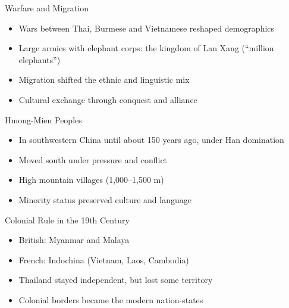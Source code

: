 \documentclass{beamer}
\begin{document}
\begin{frame}{Warfare and Migration}
    \begin{itemize}
        \item Wars between Thai, Burmese and Vietnamese reshaped demographics
        \item Large armies with elephant corps: the kingdom of Lan Xang
          (``million elephants'')
        \item Migration shifted the ethnic and linguistic mix
        \item Cultural exchange through conquest and alliance
    \end{itemize}
\end{frame}

\begin{frame}{Hmong-Mien Peoples}
    \begin{itemize}
        \item In southwestern China until about 150 years ago, under Han domination
        \item Moved south under pressure and conflict
        \item High mountain villages (1,000--1,500 m)
        \item Minority status preserved culture and language
     \end{itemize}
\end{frame}

\begin{frame}{Colonial Rule in the 19th Century}
    \begin{itemize}
        \item British: Myanmar and Malaya
        \item French: Indochina (Vietnam, Laos, Cambodia)
        \item Thailand stayed independent, but lost some territory
        \item Colonial borders became the modern nation-states
    \end{itemize}
\end{frame}
\end{document}
